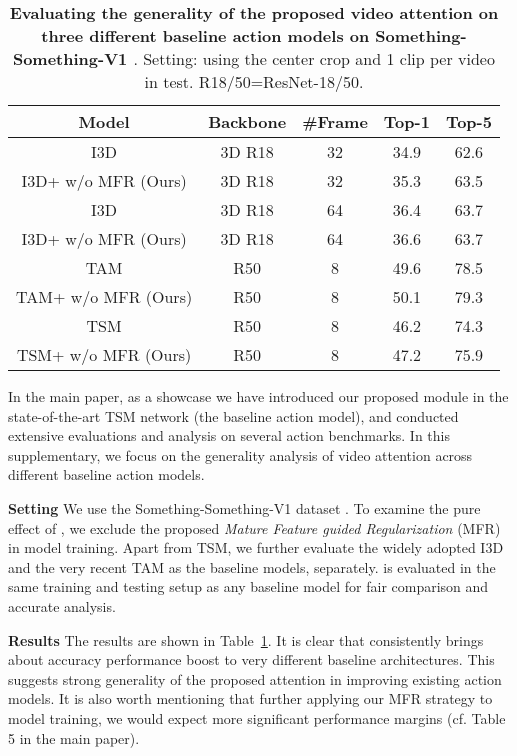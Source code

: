 \documentclass[runningheads]{llncs}
\newcommand{\keypoint}[1]{\vspace{0.1cm}\noindent\textbf{#1}\quad}
\begin{document}
\begin{table}[h]
\centering
	\begin{tabular}{c|c|c|c|c}
		\toprule {\bf Model } & {\bf Backbone } & {\bf \#Frame }
		& {\bf Top-1 } & {\bf Top-5 } \\
		\midrule
		\midrule
		I3D  \cite{carreira2017quo}                                 & 3D R18 & 32 & 34.9 & 62.6 \\
		I3D+{\bf \shortname{}} w/o MFR (Ours)  & 3D R18 & 32 & 35.3 & 63.5 \\
        \midrule
		I3D  \cite{carreira2017quo}                                 & 3D R18 & 64 & 36.4  & 63.7 \\
		I3D+{\bf \shortname{}} w/o MFR (Ours)  & 3D R18 & 64 & 36.6 & 63.7 \\
 		\midrule
		TAM \cite{MoreIsLess19}                                   & R50 & 8 & 49.6 & 78.5 \\
		TAM+{\bf \shortname{}} w/o MFR (Ours)  & R50 & 8 & 50.1 & 79.3 \\
 		\midrule
		TSM  \cite{lin2019tsm}                                  & R50 & 8 & 46.2 & 74.3 \\
		TSM+{\bf \shortname{}} w/o MFR (Ours)  & R50 & 8 & 47.2 & 75.9 \\
		\bottomrule
	\end{tabular}
	\vspace{.1cm}
	\caption{
	{\bf Evaluating the generality of the proposed \shortname{} video attention on three different baseline action models on Something-Something-V1 \cite{goyal2017something}}.
	Setting: using the center crop and 1 clip per video in test.
	R18/50=ResNet-18/50.
	}
	\label{table:supSSV1}
\end{table}

In the main paper, as a showcase we have introduced our proposed \shortname{} module in the state-of-the-art TSM network \cite{lin2019tsm} (the baseline action model),
and conducted extensive evaluations and analysis 
on several action benchmarks.
In this supplementary, we focus on the generality analysis of 
\shortname{} video attention across different baseline action models.

\keypoint{Setting}
We use the Something-Something-V1 dataset \cite{goyal2017something}.
To examine the pure effect of \shortname{},
we exclude the proposed {\em Mature Feature guided Regularization} (MFR)
in model training.
Apart from TSM, we further evaluate
the widely adopted I3D \cite{carreira2017quo}
and the very recent TAM \cite{MoreIsLess19}
as the baseline models, separately.
\shortname{} is evaluated in the same training and testing setup as any baseline model for
fair comparison and accurate analysis.

\keypoint{Results}
The results are shown in Table~\ref{table:supSSV1}.
It is clear that \shortname{}
consistently brings about accuracy performance boost to very different baseline architectures.
This suggests strong generality of
the proposed \shortname{} attention
in improving existing action models.
It is also worth mentioning that
further applying our MFR strategy to model training, we would expect more significant performance margins
(cf. Table 5 in the main paper).
\end{document}
